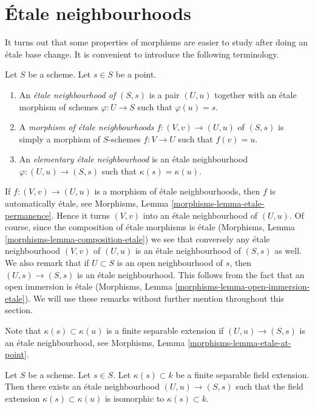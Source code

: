 \section{\'Etale neighbourhoods}
\label{section-etale-neighbourhoods}

\noindent
It turns out that some properties of morphisms are easier to study
after doing an \'etale base change. It is convenient to introduce the
following terminology.

\begin{definition}
\label{definition-etale-neighbourhood}
Let $S$ be a scheme. Let $s \in S$ be a point.
\begin{enumerate}
\item An {\it \'etale neighbourhood of $(S, s)$} is a
pair $(U, u)$ together with an \'etale morphism
of schemes $\varphi : U \to S$ such that $\varphi(u) = s$.
\item A {\it morphism of \'etale neighbourhoods} $f : (V, v) \to (U, u)$
of $(S, s)$ is simply a morphism of $S$-schemes $f : V \to U$ such
that $f(v) = u$.
\item An {\it elementary \'etale neighbourhood} is an \'etale neighbourhood
$\varphi : (U, u) \to (S, s)$ such that $\kappa(s) = \kappa(u)$.
\end{enumerate}
\end{definition}

\noindent
If $f : (V, v) \to (U, u)$ is a morphism of \'etale
neighbourhoods, then $f$ is automatically \'etale, see
Morphisms, Lemma \ref{morphisms-lemma-etale-permanence}.
Hence it turns $(V, v)$ into an \'etale neighbourhood of
$(U, u)$. Of course, since the composition of \'etale morphisms
is \'etale (Morphisms, Lemma \ref{morphisms-lemma-composition-etale})
we see that conversely any \'etale neighbourhood $(V, v)$ of
$(U, u)$ is an \'etale neighbourhood of $(S, s)$ as well.
We also remark that if $U \subset S$ is an open neighbourhood
of $s$, then $(U, s) \to (S, s)$ is an \'etale neighbourhood.
This follows from the fact that an open immersion is
\'etale (Morphisms, Lemma \ref{morphisms-lemma-open-immersion-etale}).
We will use these remarks without further mention throughout this
section.

\medskip\noindent
Note that $\kappa(s) \subset \kappa(u)$ is a finite separable extension
if $(U, u) \to (S, s)$ is an \'etale neighbourhood,
see Morphisms, Lemma \ref{morphisms-lemma-etale-at-point}.

\begin{lemma}
\label{lemma-realize-prescribed-residue-field-extension-etale}
Let $S$ be a scheme.
Let $s \in S$.
Let $\kappa(s) \subset k$ be a finite separable field extension.
Then there exists an \'etale neighbourhood $(U, u) \to (S, s)$
such that the field extension $\kappa(s) \subset \kappa(u)$ is
isomorphic to $\kappa(s) \subset k$.
\end{lemma}

